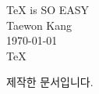 \documentclass{oblivoir}
\begin{document}
	\begin{center}
		\huge{\TeX \vspace{10pt} is SO EASY} \\
		\vspace{10pt}
		\Large{Taewon Kang} \\
		\vspace{10pt}
		\today \\
		\vspace{10pt}
		\large{\TeX\phantom{ }}
	\end{center}
	 제작한 문서입니다.
\end{document}
